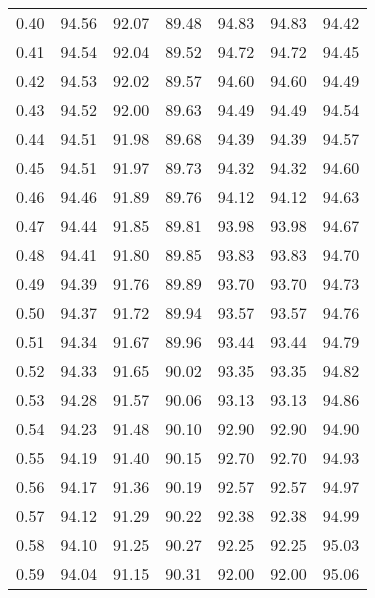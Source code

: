 \begin{tabular}{|c|c|c|c|c|c|c|}
      0.40 &     94.56 &     92.07 &      89.48 &   94.83 &      94.83 &         94.42 \\
      0.41 &     94.54 &     92.04 &      89.52 &   94.72 &      94.72 &         94.45 \\
      0.42 &     94.53 &     92.02 &      89.57 &   94.60 &      94.60 &         94.49 \\
      0.43 &     94.52 &     92.00 &      89.63 &   94.49 &      94.49 &         94.54 \\
      0.44 &     94.51 &     91.98 &      89.68 &   94.39 &      94.39 &         94.57 \\
      0.45 &     94.51 &     91.97 &      89.73 &   94.32 &      94.32 &         94.60 \\
      0.46 &     94.46 &     91.89 &      89.76 &   94.12 &      94.12 &         94.63 \\
      0.47 &     94.44 &     91.85 &      89.81 &   93.98 &      93.98 &         94.67 \\
      0.48 &     94.41 &     91.80 &      89.85 &   93.83 &      93.83 &         94.70 \\
      0.49 &     94.39 &     91.76 &      89.89 &   93.70 &      93.70 &         94.73 \\
      0.50 &     94.37 &     91.72 &      89.94 &   93.57 &      93.57 &         94.76 \\
      0.51 &     94.34 &     91.67 &      89.96 &   93.44 &      93.44 &         94.79 \\
      0.52 &     94.33 &     91.65 &      90.02 &   93.35 &      93.35 &         94.82 \\
      0.53 &     94.28 &     91.57 &      90.06 &   93.13 &      93.13 &         94.86 \\
      0.54 &     94.23 &     91.48 &      90.10 &   92.90 &      92.90 &         94.90 \\
      0.55 &     94.19 &     91.40 &      90.15 &   92.70 &      92.70 &         94.93 \\
      0.56 &     94.17 &     91.36 &      90.19 &   92.57 &      92.57 &         94.97 \\
      0.57 &     94.12 &     91.29 &      90.22 &   92.38 &      92.38 &         94.99 \\
      0.58 &     94.10 &     91.25 &      90.27 &   92.25 &      92.25 &         95.03 \\
      0.59 &     94.04 &     91.15 &      90.31 &   92.00 &      92.00 &         95.06 \\

\end{tabular}
